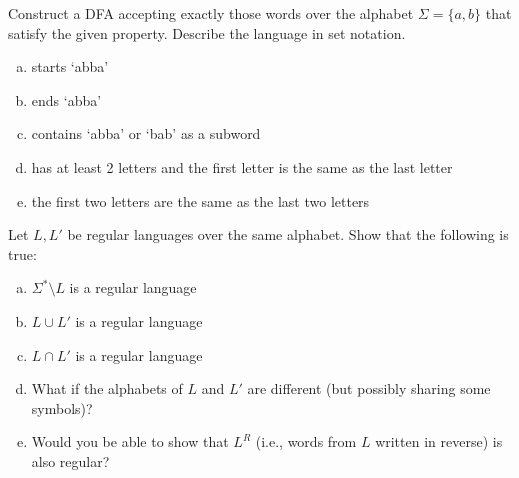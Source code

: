 \documentclass[a4paper,12pt]{amsart}
\begin{document}
\medskip\begin{problem}

    Construct a DFA accepting exactly those words over the alphabet $\Sigma=\{a,b\}$ that satisfy the given property. Describe the language in set notation.

    \medskip
    
    \begin{enumerate}[(a)]\setlength\itemsep{12pt}
        \item starts `abba'
        \item ends `abba'
        \item contains `abba' or `bab' as a subword
        \item has at least 2 letters and the first letter is the same as the last letter
        \item the first two letters are the same as the last two letters
    \end{enumerate}

\end{problem}


\medskip\begin{problem}

    Let $L,L'$ be regular languages over the same alphabet. Show that the following is true:
  
    \medskip
    
    \begin{enumerate}[(a)]\setlength\itemsep{12pt}
        \item $\Sigma^*\setminus L$ is a regular language
        \item $L\cup L'$ is a regular language
        \item $L\cap L'$ is a regular language
        \item What if the alphabets of $L$ and $L'$ are different (but possibly sharing some symbols)?
        \item Would you be able to show that  $L^R$ (i.e., words from $L$ written in reverse) is also regular?
    \end{enumerate}
      
\end{problem}
\end{document}
